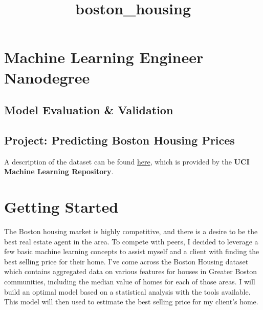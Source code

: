 \documentclass{article}
\title{boston\_housing}
\begin{document}
    
    
    \maketitle
    
    

    
    \section{Machine Learning Engineer
Nanodegree}\label{machine-learning-engineer-nanodegree}

\subsection{Model Evaluation \&
Validation}\label{model-evaluation-validation}

\subsection{Project: Predicting Boston Housing
Prices}\label{project-predicting-boston-housing-prices}

A description of the dataset can be found
\href{https://archive.ics.uci.edu/ml/datasets/Housing}{here}, which is
provided by the \textbf{UCI Machine Learning Repository}.

    \section{Getting Started}\label{getting-started}

The Boston housing market is highly competitive, and there is a desire
to be the best real estate agent in the area. To compete with peers, I
decided to leverage a few basic machine learning concepts to assist
myself and a client with finding the best selling price for their home.
I've come across the Boston Housing dataset which contains aggregated
data on various features for houses in Greater Boston communities,
including the median value of homes for each of those areas. I will
build an optimal model based on a statistical analysis with the tools
available. This model will then used to estimate the best selling price
for my client's home.
\end{document}
